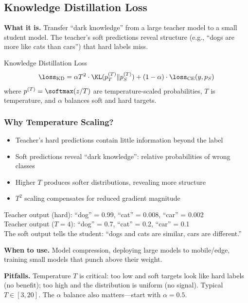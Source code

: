 \subsection{Knowledge Distillation Loss}

\textbf{What it is.} Transfer ``dark knowledge'' from a large teacher model to a small student model. The teacher's soft predictions reveal structure (e.g., ``dogs are more like cats than cars'') that hard labels miss.

\begin{mathresult}{Knowledge Distillation Loss}
\begin{equation}
\loss_{\text{KD}} = \alpha T^2 \cdot \KL(p_T^{(T)} \| p_S^{(T)}) + (1-\alpha) \cdot \loss_{\text{CE}}(y, p_S)
\end{equation}
where $p^{(T)} = \softmax(z/T)$ are temperature-scaled probabilities, $T$ is temperature, and $\alpha$ balances soft and hard targets.
\end{mathresult}

\subsubsection{Why Temperature Scaling?}

\begin{itemize}
    \item Teacher's hard predictions contain little information beyond the label
    \item Soft predictions reveal ``dark knowledge'': relative probabilities of wrong classes
    \item Higher $T$ produces softer distributions, revealing more structure
    \item $T^2$ scaling compensates for reduced gradient magnitude
\end{itemize}

\begin{example}
Teacher output (hard): ``dog'' = 0.99, ``cat'' = 0.008, ``car'' = 0.002\\
Teacher output ($T=4$): ``dog'' = 0.7, ``cat'' = 0.2, ``car'' = 0.1\\

The soft output tells the student: ``dogs and cats are similar, cars are different.''
\end{example}

\textbf{When to use.} Model compression, deploying large models to mobile/edge, training small models that punch above their weight.

\textbf{Pitfalls.} Temperature $T$ is critical: too low and soft targets look like hard labels (no benefit); too high and the distribution is uniform (no signal). Typical $T \in [3, 20]$. The $\alpha$ balance also matters---start with $\alpha = 0.5$.

